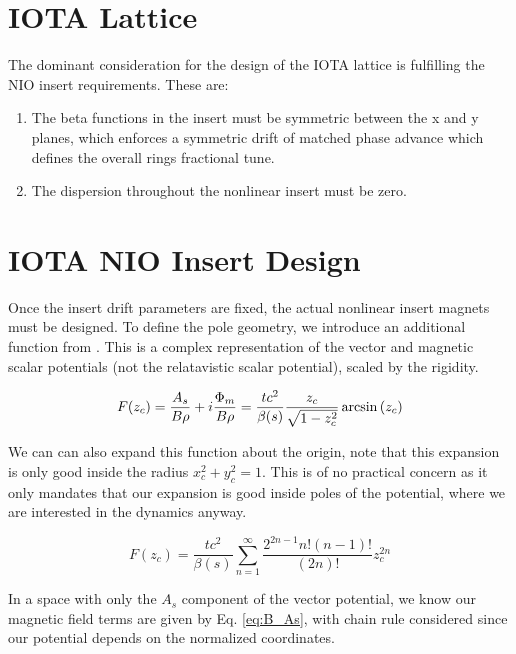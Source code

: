 \section{IOTA Lattice}
The dominant consideration for the design of the IOTA lattice is fulfilling the NIO insert requirements. These are:

\begin{enumerate}
	\item The beta functions in the insert must be symmetric between the x and y planes, which enforces a symmetric drift of matched phase advance which defines the overall rings fractional tune.
	\item The dispersion throughout the nonlinear insert must be zero.
\end{enumerate}



\section{IOTA NIO Insert Design} \label{sec:nioDesign}
Once the insert drift parameters are fixed, the actual nonlinear insert magnets must be designed. To define the pole geometry, we introduce an additional function from \cite{mitchellComplex}. This is a complex representation of the vector and magnetic scalar potentials (not the relatavistic scalar potential), scaled by the rigidity.

\begin{equation} \label{eq:genF}
	F(z_c) = \frac{A_s}{B\rho} + i\frac{\Phi_m}{B\rho} = \frac{t c^2}{\beta(s)}\frac{z_c}{\sqrt{1-z_c^2}} \arcsin{(z_c)} \\ 
\end{equation}

We can can also expand this function about the origin, note that this expansion is only good inside the radius $x_c^2 + y_c^2 = 1$. This is of no practical concern as it only mandates that our expansion is good inside poles of the potential, where we are interested in the dynamics anyway.

\begin{equation} \label{eq:powF}
	F(z_c) = \frac{t c^2}{\beta(s)} \sum_{n=1}^{\infty} \frac{2^{2n-1}n!(n-1)!}{(2n)!} z_c^{2n}
\end{equation}

In a space with only the $A_s$ component of the vector potential, we know our magnetic field terms are given by Eq. \ref{eq:B_As}, with chain rule considered since our potential depends on the normalized coordinates.

